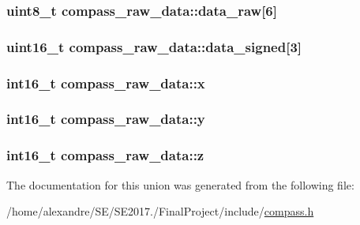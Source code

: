 \subsubsection[{\texorpdfstring{data\+\_\+raw}{data_raw}}]{\setlength{\rightskip}{0pt plus 5cm}uint8\+\_\+t compass\+\_\+raw\+\_\+data\+::data\+\_\+raw\mbox{[}6\mbox{]}}\hypertarget{unioncompass__raw__data_a6e150d8de47f85ec9c6b0b3ef7c39f83}{}\label{unioncompass__raw__data_a6e150d8de47f85ec9c6b0b3ef7c39f83}
\subsubsection[{\texorpdfstring{data\+\_\+signed}{data_signed}}]{\setlength{\rightskip}{0pt plus 5cm}uint16\+\_\+t compass\+\_\+raw\+\_\+data\+::data\+\_\+signed\mbox{[}3\mbox{]}}\hypertarget{unioncompass__raw__data_a597b0d6b3de62b99ee20496cc2919186}{}\label{unioncompass__raw__data_a597b0d6b3de62b99ee20496cc2919186}
\subsubsection[{\texorpdfstring{x}{x}}]{\setlength{\rightskip}{0pt plus 5cm}int16\+\_\+t compass\+\_\+raw\+\_\+data\+::x}\hypertarget{unioncompass__raw__data_abcb01e24cf0da22f4d89ea34b048e17c}{}\label{unioncompass__raw__data_abcb01e24cf0da22f4d89ea34b048e17c}
\subsubsection[{\texorpdfstring{y}{y}}]{\setlength{\rightskip}{0pt plus 5cm}int16\+\_\+t compass\+\_\+raw\+\_\+data\+::y}\hypertarget{unioncompass__raw__data_ab07fdca20a54692df8ff314d573c4313}{}\label{unioncompass__raw__data_ab07fdca20a54692df8ff314d573c4313}
\subsubsection[{\texorpdfstring{z}{z}}]{\setlength{\rightskip}{0pt plus 5cm}int16\+\_\+t compass\+\_\+raw\+\_\+data\+::z}\hypertarget{unioncompass__raw__data_a489aa999829f2935717add753883667c}{}\label{unioncompass__raw__data_a489aa999829f2935717add753883667c}


The documentation for this union was generated from the following file\+:\begin{DoxyCompactItemize}
\item 
/home/alexandre/\+S\+E/\+S\+E2017./\+Final\+Project/include/\hyperlink{compass_8h}{compass.\+h}\end{DoxyCompactItemize}
